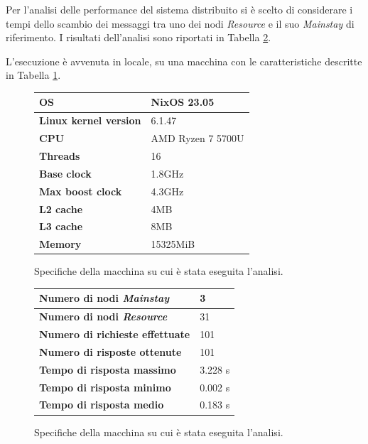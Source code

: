 \documentclass[12pt]{article}
\begin{document}
Per l'analisi delle performance del sistema distribuito si è scelto di considerare i tempi dello scambio dei messaggi tra uno dei nodi \textit{Resource} e il suo \textit{Mainstay} di riferimento. I risultati dell'analisi sono riportati in Tabella \ref{tab:analysis-specs}.

L'esecuzione è avvenuta in locale, su una macchina con le caratteristiche descritte in Tabella \ref{tab:machine-specs}.

\begin{figure}[H]
    \caption{Specifiche della macchina su cui è stata eseguita l'analisi.}
    \begin{center}
        \begin{tabular}{ | l | l | }
            \hline
            \textbf{OS} & NixOS 23.05 \\ 
            \hline
            \textbf{Linux kernel version} & 6.1.47 \\ 
            \hline
            \textbf{CPU} & AMD Ryzen 7 5700U \\
            \hline
            \textbf{Threads} & 16 \\
            \hline
            \textbf{Base clock} & 1.8GHz \\
            \hline
            \textbf{Max boost clock} & 4.3GHz \\
            \hline
            \textbf{L2 cache} & 4MB \\
            \hline
            \textbf{L3 cache} & 8MB \\
            \hline
            \textbf{Memory} & 15325MiB \\
            \hline
        \end{tabular}
    \end{center}
    \label{tab:machine-specs}
\end{figure}

\begin{figure}[H]
    \caption{Specifiche della macchina su cui è stata eseguita l'analisi.}
    \begin{center}
        \begin{tabular}{ | l | l | }
            \hline
            \textbf{Numero di nodi \textit{Mainstay}} & 3 \\ 
            \hline
            \textbf{Numero di nodi \textit{Resource}} & 31 \\ 
            \hline
            \textbf{Numero di richieste effettuate} & 101 \\
            \hline
            \textbf{Numero di risposte ottenute} & 101 \\
            \hline
            \textbf{Tempo di risposta massimo} & 3.228 s \\
            \hline
            \textbf{Tempo di risposta minimo} & 0.002 s \\
            \hline
            \textbf{Tempo di risposta medio} & 0.183 s \\
            \hline
        \end{tabular}
    \end{center}
    \label{tab:analysis-specs}
\end{figure}
\end{document}
